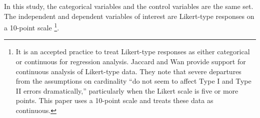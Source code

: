 \documentclass[review]{elsarticle}
\begin{document}
In this study, the categorical variables and the control variables are the same set.
The independent and dependent variables of interest are Likert-type responses on a 10-point scale
\footnote{
    It is an accepted practice to treat Likert-type responses as either categorical or continuous for regression analysis.
    Jaccard and Wan provide support for continuous analysis of Likert-type data.
    They note that severe departures from the assumptions on cardinality ``do not seem to affect Type I and Type II errors dramatically,''
    particularly when the Likert scale is five or more points\cite{jaccard1996lisrel}.
    This paper uses a 10-point scale and treats these data as continuous.
}.
\end{document}
